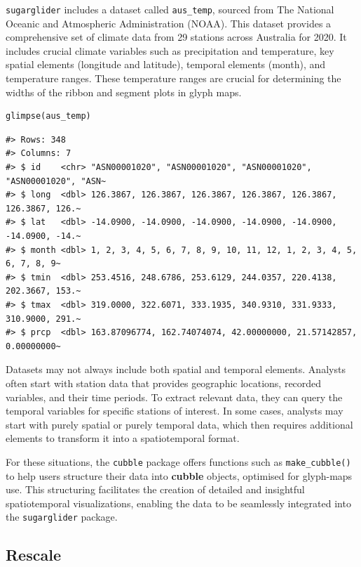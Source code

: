 \texttt{sugarglider} includes a dataset called \texttt{aus\_temp}, sourced from The National Oceanic and Atmospheric Administration (NOAA). This dataset provides a comprehensive set of climate data from 29 stations across Australia for 2020. It includes crucial climate variables such as precipitation and temperature, key spatial elements (longitude and latitude), temporal elements (month), and temperature ranges. These temperature ranges are crucial for determining the widths of the ribbon and segment plots in glyph maps.

\begin{verbatim}
glimpse(aus_temp)
\end{verbatim}

\begin{verbatim}
#> Rows: 348
#> Columns: 7
#> $ id    <chr> "ASN00001020", "ASN00001020", "ASN00001020", "ASN00001020", "ASN~
#> $ long  <dbl> 126.3867, 126.3867, 126.3867, 126.3867, 126.3867, 126.3867, 126.~
#> $ lat   <dbl> -14.0900, -14.0900, -14.0900, -14.0900, -14.0900, -14.0900, -14.~
#> $ month <dbl> 1, 2, 3, 4, 5, 6, 7, 8, 9, 10, 11, 12, 1, 2, 3, 4, 5, 6, 7, 8, 9~
#> $ tmin  <dbl> 253.4516, 248.6786, 253.6129, 244.0357, 220.4138, 202.3667, 153.~
#> $ tmax  <dbl> 319.0000, 322.6071, 333.1935, 340.9310, 331.9333, 310.9000, 291.~
#> $ prcp  <dbl> 163.87096774, 162.74074074, 42.00000000, 21.57142857, 0.00000000~
\end{verbatim}

Datasets may not always include both spatial and temporal elements. Analysts often start with station data that provides geographic locations, recorded variables, and their time periods. To extract relevant data, they can query the temporal variables for specific stations of interest. In some cases, analysts may start with purely spatial or purely temporal data, which then requires additional elements to transform it into a spatiotemporal format.

For these situations, the \texttt{cubble} package offers functions such as \texttt{make\_cubble()} to help users structure their data into \textbf{cubble} objects, optimised for glyph-maps use. This structuring facilitates the creation of detailed and insightful spatiotemporal visualizations, enabling the data to be seamlessly integrated into the \texttt{sugarglider} package.

\hypertarget{rescale}{%
\subsection{Rescale}\label{rescale}}

